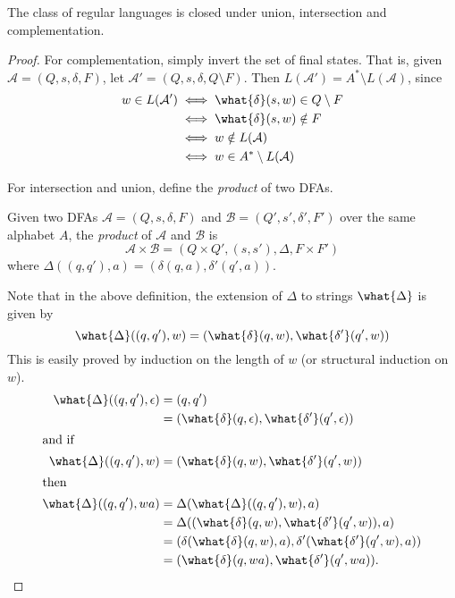 \begin{theorem*} \label{thm:dfa:regular:closure1}
    The class of regular languages is closed under union, intersection and
    complementation.
\end{theorem*}
\begin{proof}
    For complementation, simply invert the set of final states.
    That is, given $\mathcal{A} = (Q, s, \delta, F)$, let
    $\mathcal{A}' = (Q, s, \delta, Q \setminus F)$.
    Then $L(\mathcal{A}') = A^* \setminus L(\mathcal{A})$, since
    \begin{align*}
        w \in L(\mathcal{A}') &\iff \what{\delta}(s, w) \in Q \setminus F \\
        &\iff \what{\delta}(s, w) \notin F \\
        &\iff w \notin L(\mathcal{A}) \\
        &\iff w \in A^* \setminus L(\mathcal{A})
    \end{align*}

    For intersection and union, define the \emph{product} of two DFAs.
    \begin{definition}[Product] \label{def:dfa:product}
        Given two DFAs $\mathcal{A} = (Q, s, \delta, F)$ and
        $\mathcal{B} = (Q', s', \delta', F')$ over the same alphabet $A$, the
        \emph{product} of $\mathcal{A}$ and $\mathcal{B}$ is \[
            \mathcal{A} \times \mathcal{B} = (Q \times Q', (s, s'), \Delta,
            F \times F')
        \] where $\Delta((q, q'), a) = (\delta(q, a), \delta'(q', a))$.
    \end{definition}
    Note that in the above definition, the extension of $\Delta$ to strings
    $\what{\Delta}$ is given by \[
        \what{\Delta}((q, q'), w) = (\what{\delta}(q, w), \what{\delta'}(q', w))
    \]
    This is easily proved by induction on the length of $w$ (or structural
    induction on $w$).
    \begin{align*}
        \what{\Delta}((q, q'), \epsilon) &= (q, q') \\
        &= (\what{\delta}(q, \epsilon), \what{\delta'}(q', \epsilon)) \\
        \shortintertext{and if}
        \what{\Delta}((q, q'), w) &= (\what{\delta}(q, w), \what{\delta'}(q', w)) \\
        \shortintertext{then}
        \what{\Delta}((q, q'), wa) &= \Delta(\what{\Delta}((q, q'), w), a) \\
        &= \Delta((\what{\delta}(q, w), \what{\delta'}(q', w)), a) \\
        &= (\delta(\what{\delta}(q, w), a), \delta'(\what{\delta'}(q', w), a)) \\
        &= (\what{\delta}(q, wa), \what{\delta'}(q', wa)).
    \end{align*}


\end{proof}
